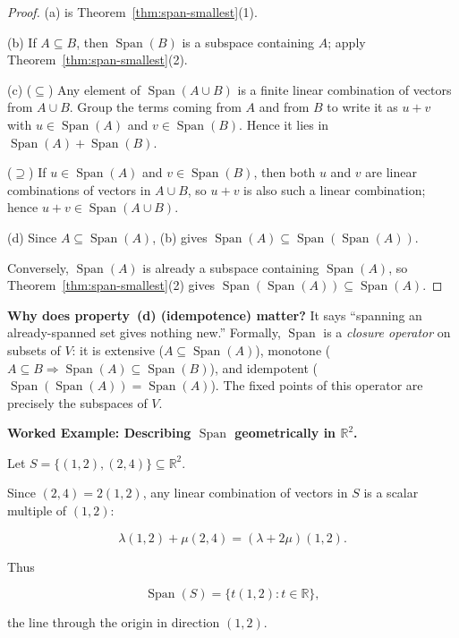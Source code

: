 \begin{proof}

(a) is Theorem~\ref{thm:span-smallest}(1).

(b) If $A\subseteq B$, then $\operatorname{Span}(B)$ is a subspace containing $A$; apply Theorem~\ref{thm:span-smallest}(2).

(c) ($\subseteq$) Any element of $\operatorname{Span}(A\cup B)$ is a finite linear combination of vectors from $A\cup B$. Group the terms coming from $A$ and from $B$ to write it as $u+v$ with $u\in \operatorname{Span}(A)$ and $v\in \operatorname{Span}(B)$. Hence it lies in $\operatorname{Span}(A)+\operatorname{Span}(B)$.

($\supseteq$) If $u\in \operatorname{Span}(A)$ and $v\in \operatorname{Span}(B)$, then both $u$ and $v$ are linear combinations of vectors in $A\cup B$, so $u+v$ is also such a linear combination; hence $u+v\in \operatorname{Span}(A\cup B)$.

(d) Since $A\subseteq \operatorname{Span}(A)$, (b) gives $\operatorname{Span}(A)\subseteq \operatorname{Span}(\operatorname{Span}(A))$.

Conversely, $\operatorname{Span}(A)$ is already a subspace containing $\operatorname{Span}(A)$, so Theorem~\ref{thm:span-smallest}(2) gives $\operatorname{Span}(\operatorname{Span}(A))\subseteq \operatorname{Span}(A)$.

\end{proof}

\begin{policynote}
\textbf{Why does property~(d) (idempotence) matter?}
It says ``spanning an already-spanned set gives nothing new.''  Formally, $\operatorname{Span}$ is a \emph{closure operator} on subsets of $V$: it is extensive ($A\subseteq\operatorname{Span}(A)$), monotone ($A\subseteq B\Rightarrow\operatorname{Span}(A)\subseteq\operatorname{Span}(B)$), and idempotent ($\operatorname{Span}(\operatorname{Span}(A))=\operatorname{Span}(A)$).  The fixed points of this operator are precisely the subspaces of $V$.
\end{policynote}

\begin{examplebox}

\textbf{Worked Example: Describing $\operatorname{Span}$ geometrically in $\mathbb{R}^2$.}

Let $S=\{(1,2),(2,4)\}\subseteq \mathbb{R}^2$.

Since $(2,4)=2(1,2)$, any linear combination of vectors in $S$ is a scalar multiple of $(1,2)$:

\[
\lambda(1,2)+\mu(2,4)=(\lambda+2\mu)(1,2).
\]

Thus

\[
\operatorname{Span}(S)=\{t(1,2): t\in\mathbb{R}\},
\]

the line through the origin in direction $(1,2)$.

\end{examplebox}

